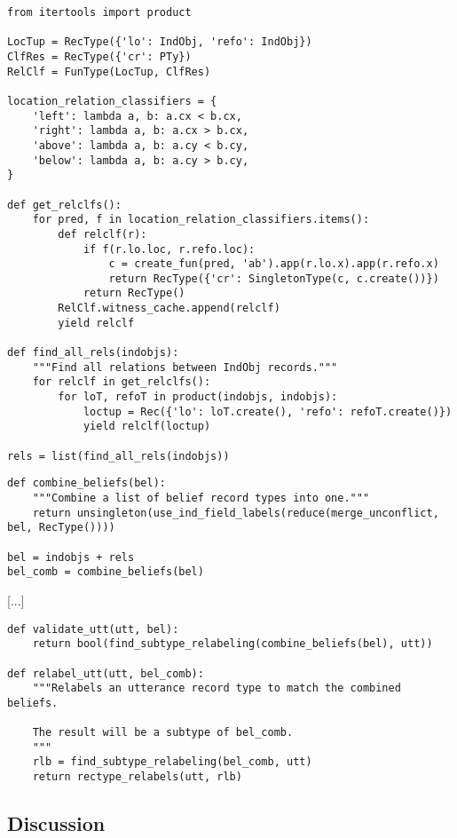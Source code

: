\begin{lstlisting}[label=lst:relclf, caption=Spatial relation classifiers]
from itertools import product

LocTup = RecType({'lo': IndObj, 'refo': IndObj})
ClfRes = RecType({'cr': PTy})
RelClf = FunType(LocTup, ClfRes)

location_relation_classifiers = {
    'left': lambda a, b: a.cx < b.cx,
    'right': lambda a, b: a.cx > b.cx,
    'above': lambda a, b: a.cy < b.cy,
    'below': lambda a, b: a.cy > b.cy,
}

def get_relclfs():
    for pred, f in location_relation_classifiers.items():
        def relclf(r):
            if f(r.lo.loc, r.refo.loc):
                c = create_fun(pred, 'ab').app(r.lo.x).app(r.refo.x)
                return RecType({'cr': SingletonType(c, c.create())})
            return RecType()
        RelClf.witness_cache.append(relclf)
        yield relclf

def find_all_rels(indobjs):
    """Find all relations between IndObj records."""
    for relclf in get_relclfs():
        for loT, refoT in product(indobjs, indobjs):
            loctup = Rec({'lo': loT.create(), 'refo': refoT.create()})
            yield relclf(loctup)

rels = list(find_all_rels(indobjs))
\end{lstlisting}

\begin{lstlisting}[label=lst:bel, caption=Combining beliefs.]
def combine_beliefs(bel):
    """Combine a list of belief record types into one."""
    return unsingleton(use_ind_field_labels(reduce(merge_unconflict, bel, RecType())))

bel = indobjs + rels
bel_comb = combine_beliefs(bel)
\end{lstlisting}

[...]

\begin{lstlisting}
def validate_utt(utt, bel):
    return bool(find_subtype_relabeling(combine_beliefs(bel), utt))

def relabel_utt(utt, bel_comb):
    """Relabels an utterance record type to match the combined beliefs.
    
    The result will be a subtype of bel_comb.
    """
    rlb = find_subtype_relabeling(bel_comb, utt)
    return rectype_relabels(utt, rlb)
\end{lstlisting}

\subsection{Discussion}
\label{sec:discussion}


